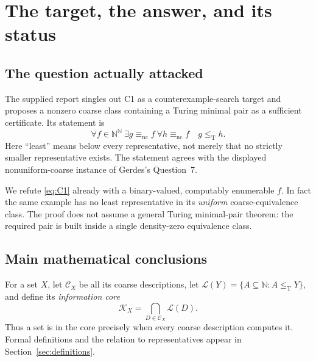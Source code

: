 \documentclass[11pt,a4paper]{article}
\newcommand{\N}{\mathbb N}
\newcommand{\Baire}{\N^{\N}}
\newcommand{\leT}{\leq_{\mathrm T}}
\newcommand{\nc}{\mathrm{nc}}
\newcommand{\CD}[1]{\mathcal C_{#1}}
\newcommand{\Core}[1]{\mathcal K_{#1}}
\newcommand{\Low}[1]{\mathcal L(#1)}
\theoremstyle{definition}\newtheorem{definition}[theorem]{Definition}
\theoremstyle{remark}\newtheorem{remark}[theorem]{Remark}
\begin{document}
\section{The target, the answer, and its status}
\label{sec:answer}
\subsection{The question actually attacked}
The supplied report singles out C1 as a counterexample-search target and proposes a nonzero coarse class containing a Turing minimal pair as a sufficient certificate. Its statement is
\begin{equation}\label{eq:C1}
 \forall f\in\Baire\ \exists g\equiv_{\nc}f\
 \forall h\equiv_{\nc}f\quad g\leT h.
\end{equation}
Here ``least'' means below every representative, not merely that no strictly smaller representative exists. The statement agrees with the displayed nonuniform-coarse instance of Gerdes's Question~7.\cite[entry C1]{Input}\cite[Section 7, Question 7]{Gerdes}

We refute \eqref{eq:C1} already with a binary-valued, computably enumerable $f$. In fact the same example has no least representative in its \emph{uniform} coarse-equivalence class. The proof does not assume a general Turing minimal-pair theorem: the required pair is built inside a single density-zero equivalence class.

\subsection{Main mathematical conclusions}
For a set $X$, let $\CD X$ be all its coarse descriptions, let
$\Low Y=\{A\subseteq\N:A\leT Y\}$, and define its \emph{information core}
\[
 \Core X=\bigcap_{D\in\CD X}\Low D.
\]
Thus a set is in the core precisely when every coarse description computes it. Formal definitions and the relation to representatives appear in Section~\ref{sec:definitions}.
\end{document}
